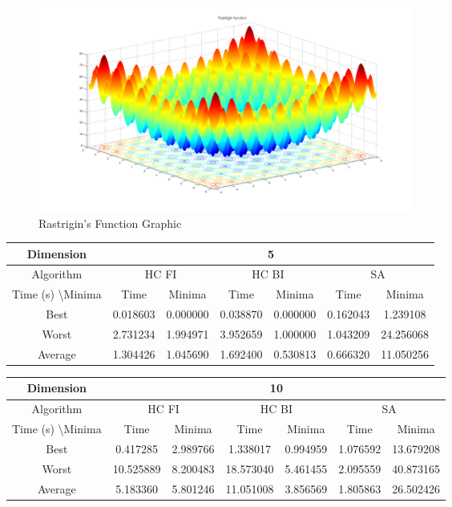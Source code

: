 \documentclass{article}
\begin{document}
\begin{figure}[h!]
  \includegraphics[width=0.6\textwidth]{Rastrigin.png}
  \caption{Rastrigin's Function Graphic\cite{wikiRastrigin}}
\end{figure}

\begin{table}[H]
\begin{tabular}{|c|c|c|c|c|c|c|}
\hline
Dimension                      & \multicolumn{6}{c|}{5}                                                            \\ \hline
Algorithm                      & \multicolumn{2}{c|}{HC FI} & \multicolumn{2}{c|}{HC BI} & \multicolumn{2}{c|}{SA} \\ \hline
Time (s) \textbackslash Minima & Time         & Minima      & Time         & Minima      & Time       & Minima     \\ \hline
Best                           & 0.018603     & 0.000000    & 0.038870     & 0.000000    & 0.162043   & 1.239108   \\ \hline
Worst                          & 2.731234     & 1.994971    & 3.952659     & 1.000000    & 1.043209   & 24.256068  \\ \hline
Average                        & 1.304426     & 1.045690    & 1.692400     & 0.530813    & 0.666320   & 11.050256  \\ \hline
\end{tabular}
\end{table}

\begin{table}[H]
\begin{tabular}{|c|c|c|c|c|c|c|}
\hline
Dimension                      & \multicolumn{6}{c|}{10}                                                           \\ \hline
Algorithm                      & \multicolumn{2}{c|}{HC FI} & \multicolumn{2}{c|}{HC BI} & \multicolumn{2}{c|}{SA} \\ \hline
Time (s) \textbackslash Minima & Time         & Minima      & Time         & Minima      & Time       & Minima     \\ \hline
Best                           & 0.417285     & 2.989766    & 1.338017     & 0.994959    & 1.076592   & 13.679208  \\ \hline
Worst                          & 10.525889    & 8.200483    & 18.573040    & 5.461455    & 2.095559   & 40.873165  \\ \hline
Average                        & 5.183360     & 5.801246    & 11.051008    & 3.856569    & 1.805863   & 26.502426  \\ \hline
\end{tabular}
\end{table}
\end{document}
